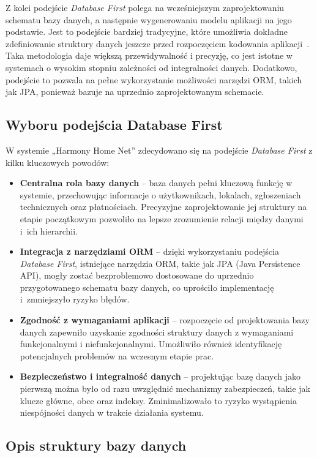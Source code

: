 Z kolei podejście \emph{Database First} polega na wcześniejszym zaprojektowaniu schematu bazy danych, a następnie wygenerowaniu modelu aplikacji na jego podstawie. Jest to podejście bardziej tradycyjne, które umożliwia dokładne zdefiniowanie struktury danych jeszcze przed rozpoczęciem kodowania aplikacji~\cite{DB_FIRST}. Taka metodologia daje większą przewidywalność i precyzję, co jest istotne w systemach o wysokim stopniu zależności od integralności danych. Dodatkowo, podejście to pozwala na pełne wykorzystanie możliwości narzędzi ORM, takich jak JPA, ponieważ bazuje na uprzednio zaprojektowanym schemacie.

\subsection{Wyboru podejścia Database First}

W systemie „Harmony Home Net” zdecydowano się na podejście \emph{Database First} z kilku kluczowych powodów:

\begin{itemize}
    \item \textbf{Centralna rola bazy danych} -- baza danych pełni kluczową funkcję w systemie, przechowując informacje o użytkownikach, lokalach, zgłoszeniach technicznych oraz płatnościach. Precyzyjne zaprojektowanie jej struktury na etapie początkowym pozwoliło na lepsze zrozumienie relacji między danymi i~ich hierarchii.
    \item \textbf{Integracja z narzędziami ORM} -- dzięki wykorzystaniu podejścia \emph{Database First}, istniejące narzędzia ORM, takie jak JPA (Java Persistence API), mogły zostać bezproblemowo dostosowane do uprzednio przygotowanego schematu bazy danych, co uprościło implementację i~zmniejszyło ryzyko błędów.
    \item \textbf{Zgodność z wymaganiami aplikacji} -- rozpoczęcie od projektowania bazy danych zapewniło uzyskanie zgodności struktury danych z wymaganiami funkcjonalnymi i niefunkcjonalnymi. Umożliwiło również identyfikację potencjalnych problemów na wczesnym etapie prac.
    \item \textbf{Bezpieczeństwo i integralność danych} -- projektując bazę danych jako pierwszą można było od razu uwzględnić mechanizmy zabezpieczeń, takie jak klucze główne, obce oraz indeksy. Zminimalizowało to ryzyko wystąpienia niespójności danych w trakcie działania systemu.
\end{itemize}

\subsection{Opis struktury bazy danych}

